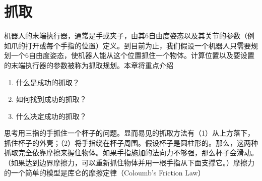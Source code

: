 \chapter{抓取}


机器人的末端执行器，通常是手或夹子，由其6自由度姿态以及其关节的参数（例如爪的打开或每个手指的位置）定义。到目前为止，我们假设一个机器人只需要规划一个6自由度姿态，使机器人能从这个位置抓住一个物体。计算位置以及要设置的末端执行器的参数被称为抓取规划。本章将重点介绍

\begin{enumerate}

\item 什么是成功的抓取？
\item 如何找到成功的抓取？
\item 什么决定成功的抓取？
\end{enumerate}



思考用三指的手抓住一个杯子的问题。显而易见的抓取方法有（1）从上方落下，抓住杯子的外壳；（2）将手指绕在杯子周围。假设杯子是圆柱形的。那么，这两种抓取完全依靠摩擦来握住物体。如果手指施加的法向力不够强，那么杯子会滑动。（如果达到边界摩擦力，可以重新抓住物体并用一根手指从下面支撑它。）摩擦力的一个简单的模型是库仑的摩擦定律（Coloumb's Friction Law）

